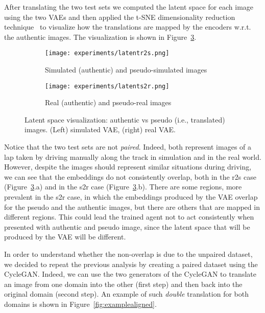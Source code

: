 After translating the two test sets we computed the latent space for each image using the two VAEs and then applied the t-SNE dimensionality reduction technique~\cite{tsne} to visualize how the translations are mapped by the encoders w.r.t. the authentic images. The visualization is shown in Figure~\ref{fig:latentpseudo}.

\begin{figure}[h]
  \centering
  \begin{subfigure}{.5\linewidth}
	      \centering
	      \texttt{[image: experiments/latentr2s.png]}
	      \caption{Simulated (authentic) and pseudo-simulated images}\label{fig:latentr2s}
	  \end{subfigure}%
      \hfill
  \begin{subfigure}{.5\linewidth}
	      \centering
	      \texttt{[image: experiments/latents2r.png]}
	      \caption{Real (authentic) and pseudo-real images}\label{fig:latents2r}
	  \end{subfigure}
  \caption{Latent space visualization: authentic vs pseudo (i.e., translated) images. (Left) simulated VAE, (right) real VAE.}
  \label{fig:latentpseudo}
\end{figure}

Notice that the two test sets are not \textit{paired}. Indeed, both represent images of a lap taken by driving manually along the track in simulation and in the real world. However, despite the images should represent similar situations during driving, we can see that the embeddings do not consistently overlap, both in the r2s case (Figure~\ref{fig:latentpseudo}.a) and in the s2r case (Figure~\ref{fig:latentpseudo}.b). There are some regions, more prevalent in the s2r case, in which the embeddings produced by the VAE overlap for the pseudo and the authentic images, but there are others that are mapped in different regions. This could lead the trained agent not to act consistently when presented with authentic and pseudo image, since the latent space that will be produced by the VAE will be different.

In order to understand whether the non-overlap is due to the unpaired dataset, we decided to repeat the previous analysis by creating a paired dataset using the CycleGAN. Indeed, we can use the two generators of the CycleGAN to translate an image from one domain into the other (first step) and then back into the original domain (second step). An example of such \textit{double} translation for both domains is shown in Figure~\ref{fig:examplealigned}.

